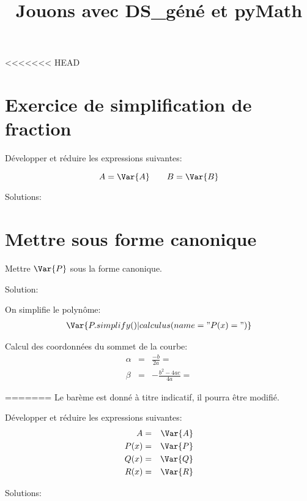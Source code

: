\documentclass[a4paper,10pt]{article}
\title{Jouons avec DS\_géné et pyMath}
\date{}
\begin{document}
\maketitle

<<<<<<< HEAD
\section{Exercice de simplification de fraction}
		Développer et réduire les expressions suivantes:

		\begin{equation*}
            A = \Var{ A } \qquad
            B = \Var{ B }
		\end{equation*}

        Solutions:

\section{Mettre sous forme canonique}
    Mettre $\Var{P}$ sous la forme canonique.

    Solution:

    On simplifie le polynôme:
    \begin{eqnarray*}
        \Var{P.simplify() | calculus(name = "P(x) = ")}
    \end{eqnarray*}
    

    Calcul des coordonnées du sommet de la courbe:
    \begin{eqnarray*}
        \alpha & = & \frac{-b}{2a} =  \\
        \beta & = & -\frac{b^2 - 4ac}{4a} = 
    \end{eqnarray*}
    
=======
\Calc
Le barème est donné à titre indicatif, il pourra être modifié.

\begin{Exo}[4.5]
		Développer et réduire les expressions suivantes:
            \begin{eqnarray*}
                A &=& \Var{ A } \\
                P(x) &=& \Var{ P } \\
                Q(x) &=& \Var{ Q }\\
                R(x) &=& \Var{R} 
            \end{eqnarray*}

        Solutions:

\end{Exo}
\end{document}
